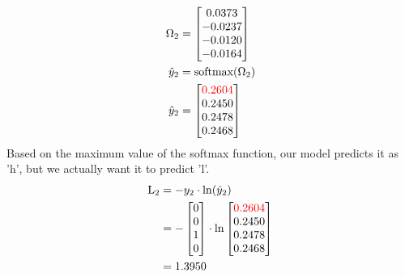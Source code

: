 \documentclass{article}
\begin{document}
\begin{align*}
    \Omega_2 & = \begin{bmatrix}
 0.0373 \\
 -0.0237\\
 -0.0120\\
 -0.0164
\end{bmatrix} \\
    \hat{y}_2 & = \text{softmax}(\Omega_2) \\
    \hat{y}_2 & = \begin{bmatrix}
 \textcolor{red}{0.2604} \\
 0.2450\\
 0.2478\\
 0.2468\\
\end{bmatrix}
\end{align*}
Based on the maximum value of the softmax function, our model predicts it as 'h', but we actually want it to predict 'l'.
\begin{align*}
    \text{L}_{2} & = -y_2 \cdot \ln(\hat{y}_2) \\
    &=-\begin{bmatrix} 0 \\ 0 \\ 1 \\ 0 \end{bmatrix} \cdot \ln{\begin{bmatrix}
 \textcolor{red}{0.2604} \\
 0.2450\\
 0.2478\\
 0.2468\\
\end{bmatrix}}\\
    &= 1.3950
\end{align*}
\end{document}
